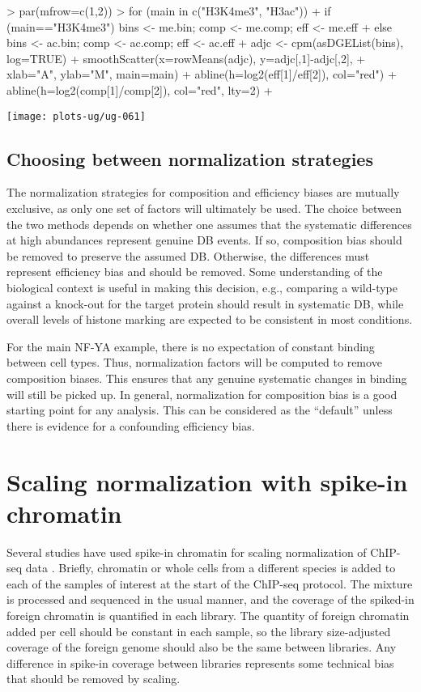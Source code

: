 \documentclass[12pt]{report}
\renewenvironment{Schunk}{\vspace{0pt}}{\vspace{0pt}}
\begin{document}
\begin{Schunk}
\begin{Sinput}
> par(mfrow=c(1,2))
> for (main in c("H3K4me3", "H3ac")) { 
+     if (main=="H3K4me3") { bins <- me.bin; comp <- me.comp; eff <- me.eff }
+     else { bins <- ac.bin; comp <- ac.comp; eff <- ac.eff }
+     adjc <- cpm(asDGEList(bins), log=TRUE)
+     smoothScatter(x=rowMeans(adjc), y=adjc[,1]-adjc[,2], 
+         xlab="A", ylab="M", main=main)
+     abline(h=log2(eff[1]/eff[2]), col="red")
+     abline(h=log2(comp[1]/comp[2]), col="red", lty=2)
+ }
\end{Sinput}
\end{Schunk}

\begin{center}
\texttt{[image: plots-ug/ug-061]}
\end{center}

\subsection{Choosing between normalization strategies}
The normalization strategies for composition and efficiency biases are mutually exclusive, as only one set of factors will ultimately be used.
The choice between the two methods depends on whether one assumes that the systematic differences at high abundances represent genuine DB events.
If so, composition bias should be removed to preserve the assumed DB.
Otherwise, the differences must represent efficiency bias and should be removed.
Some understanding of the biological context is useful in making this decision, e.g., comparing a wild-type against a knock-out for the target protein should result in systematic DB, while overall levels of histone marking are expected to be consistent in most conditions.

For the main NF-YA example, there is no expectation of constant binding between cell types.
Thus, normalization factors will be computed to remove composition biases.
This ensures that any genuine systematic changes in binding will still be picked up.
In general, normalization for composition bias is a good starting point for any analysis.
This can be considered as the ``default'' unless there is evidence for a confounding efficiency bias.

\section{Scaling normalization with spike-in chromatin}
Several studies have used spike-in chromatin for scaling normalization of ChIP-seq data \citep{bonhoure2014quantifying,orlando2014quantitative}.
Briefly, chromatin or whole cells from a different species is added to each of the samples of interest at the start of the ChIP-seq protocol.
The mixture is processed and sequenced in the usual manner, and the coverage of the spiked-in foreign chromatin is quantified in each library.
The quantity of foreign chromatin added per cell should be constant in each sample, so the library size-adjusted coverage of the foreign genome should also be the same between libraries.
Any difference in spike-in coverage between libraries represents some technical bias that should be removed by scaling.
\end{document}
